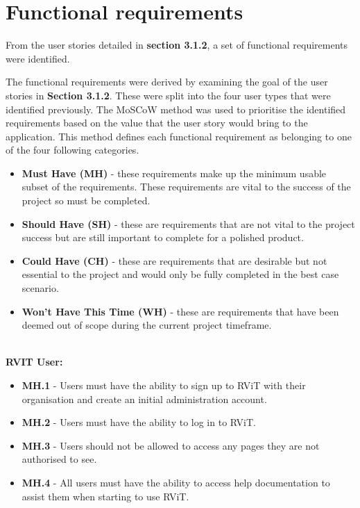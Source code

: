 \documentclass[l4proj.tex]{subfiles}
\begin{document}
\section{Functional requirements}
From the user stories detailed in \textbf{section 3.1.2}, a set of functional requirements were identified. 

The functional requirements were derived by examining the goal of the user stories in \textbf{Section 3.1.2}. These were split into the four user types that were identified previously. The MoSCoW method \cite{Consort14} was used to prioritise the identified requirements based on the value that the user story would bring to the application. This method defines each functional requirement as belonging to one of the four following categories.
\begin{itemize}
    \item \textbf{Must Have (MH)} - these requirements make up the minimum usable subset of the requirements. These requirements are vital to the success of the project so must be completed.
    \item \textbf{Should Have (SH)} - these are requirements that are not vital to the project success but are still important to complete for a polished product.
    \item \textbf{Could Have (CH)} - these are requirements that are desirable but not essential to the project and would only be fully completed in the best case scenario. 
    \item \textbf{Won't Have This Time (WH)} - these are requirements that have been deemed out of scope during the current project timeframe.
\end{itemize}
\hfill

\hfill\\
\textbf{RVIT User:}
\begin{itemize}
    \item \textbf{MH.1} - Users must have the ability to sign up to RViT with their organisation and create an initial administration account.
    \item \textbf{MH.2} - Users must have the ability to log in to RViT.
    \item \textbf{MH.3} - Users should not be allowed to access any pages they are not authorised to see.
    \item \textbf{MH.4} - All users must have the ability to access help documentation to assist them when starting to use RViT.
\end{itemize}
\hfill
 
\end{document}
